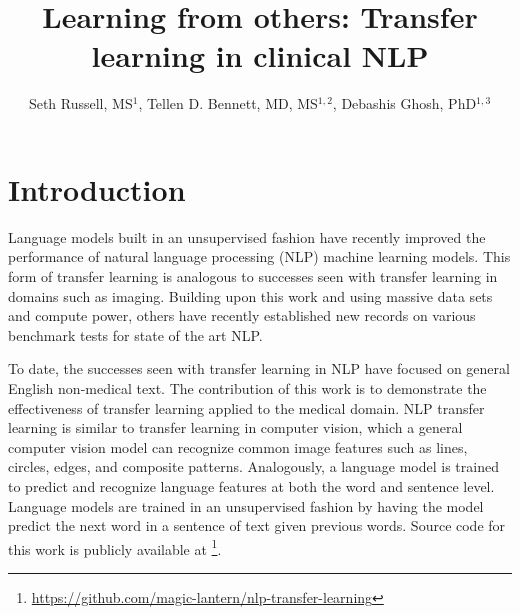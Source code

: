 \documentclass{amia}
\begin{document}
\title{Learning from others: Transfer learning in clinical NLP}

\author{Seth Russell, MS$^{1}$,
    Tellen D. Bennett, MD, MS$^{1,2}$,
    Debashis Ghosh, PhD$^{1,3}$}


\maketitle



\section*{Introduction}

Language models built in an unsupervised fashion have recently improved the performance of natural language processing (NLP) machine learning models.\cite{howard_universal_2018} This form of transfer learning is analogous to successes seen with transfer learning in domains such as imaging. Building upon this work and using massive data sets and compute power, others have recently established new records on various benchmark tests for state of the art NLP.\cite{radford_language_2019}

To date, the successes seen with transfer learning in NLP have focused on general English non-medical text. The contribution of this work is to demonstrate the effectiveness of transfer learning applied to the medical domain. NLP transfer learning is similar to transfer learning in computer vision, which a general computer vision model can recognize common image features such as lines, circles, edges, and composite patterns. Analogously, a language model is trained to predict and recognize language features at both the word and sentence level. Language models are trained in an unsupervised fashion by having the model predict the next word in a sentence of text given previous words. Source code for this work is publicly available at \footnote{\url{https://github.com/magic-lantern/nlp-transfer-learning}}.
\end{document}
